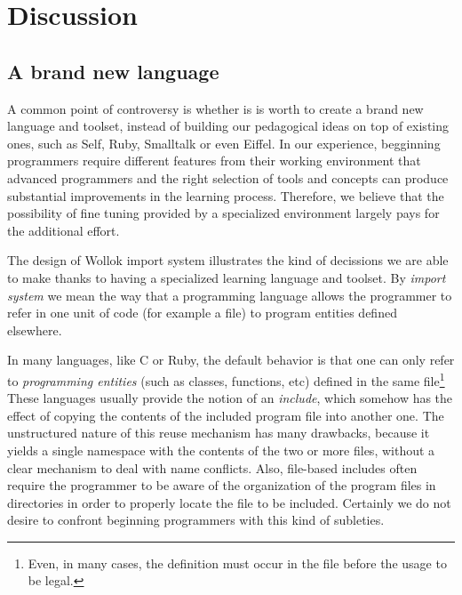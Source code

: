 \section{Discussion}
\label{sec:discussion}


\subsection{A brand new language}
\label{sec:newLanguage}
A common point of controversy is whether is is worth to create a brand new language and toolset, 
instead of building our pedagogical ideas on top of existing ones, such as Self, Ruby, Smalltalk or even Eiffel.
In our experience, begginning programmers require different features from their working environment that advanced programmers
and the right selection of tools and concepts can produce substantial improvements in the learning process.
Therefore, we believe that the possibility of fine tuning provided by a specialized environment largely pays for the additional effort.

The design of Wollok import system illustrates the kind of decissions we are able to make thanks to having a specialized learning language and toolset.
By \emph{import system} we mean the way that a programming language allows the programmer to refer in one unit of code (for example a file) to program entities defined elsewhere.

\medskip
In many languages, like C or Ruby, the default behavior is that one can only refer to \emph{programming entities} (such as classes, functions, etc) defined in the same 
file\footnote{Even, in many cases, the definition must occur in the file before the usage to be legal.}
These languages usually provide the notion of an \emph{include}, 
which somehow has the effect of copying the contents of the included program file into another one.
The unstructured nature of this reuse mechanism has many drawbacks, 
because it yields a single namespace with the contents of the two or more files, 
without a clear mechanism to deal with name conflicts.
Also, file-based includes often require the programmer to be aware of the organization of the program files in directories in order to properly locate the file to be included.
Certainly we do not desire to confront beginning programmers with this kind of subleties.

